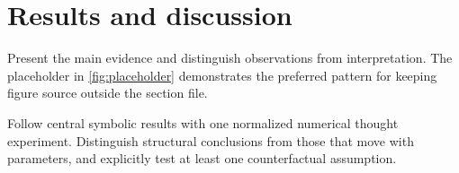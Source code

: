 \section{Results and discussion}
\label{sec:results}

Present the main evidence and distinguish observations from interpretation.
The placeholder in \cref{fig:placeholder} demonstrates the preferred pattern
for keeping figure source outside the section file.



Follow central symbolic results with one normalized numerical thought
experiment. Distinguish structural conclusions from those that move with
parameters, and explicitly test at least one counterfactual assumption.
